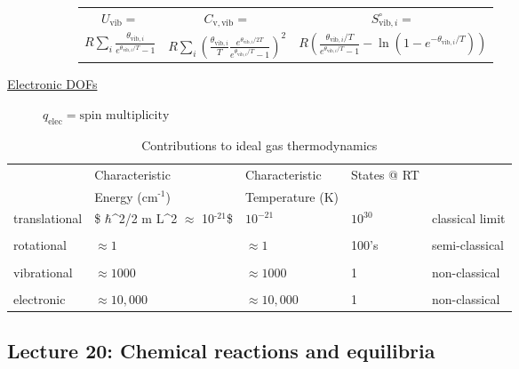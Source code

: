 \documentclass[11pt]{article}
\begin{document}
\begin{table}
\begin{center}
\begin{description}
\begin{description}
\begin{tabular}{ccc}
$ U_\mathrm{vib}= $ & $  C_\mathrm{v,vib} = $ & $S^\circ_{\mathrm{vib},i}=$ \\
$\displaystyle
R\sum_i\frac{\theta_{\mathrm{vib},i}}{e^{\theta_{\mathrm{vib},i}/T}-1}$ &
$\displaystyle R \sum_i \left (
  \frac{\theta_{\mathrm{vib},i}}{T}\frac{e^{\theta_{\mathrm{vib},i}/2T}}{e^{\theta_{\mathrm{vib},i}/T}-1}
\right )^2 $ & $\displaystyle R \left ( \frac{\theta_{\mathrm{vib},i}/T}{e^{\theta_{\mathrm{vib},i}/T}-1}
-\ln(1-e^{-\theta_{\mathrm{vib},i}/T})\right ) $ \\
\end{tabular}

\end{description}
\item[\underline{Electronic DOFs}] {}
$q_\mathrm{elec} = \text{spin multiplicity}$


\end{description}
\end{center}
\end{table}

\begin{table}[htbp]
\caption{Contributions to ideal gas thermodynamics}
\centering
\begin{tabular}{lllll}
\hline
 & Characteristic & Characteristic & States @ RT & \\
 & Energy (cm\(^{\text{-1}}\)) & Temperature (K) &  & \\
\hline
translational & \$ \(\hbar\)\^{}2/2 m L\^{}2 \(\approx\) 10\(^{\text{-21}}\)\$ & \(10^{-21}\) & \(10^{30}\) & classical limit\\
 &  &  &  & \\
rotational & \(\approx 1\) & \(\approx 1\) & 100's & semi-classical\\
 &  &  &  & \\
vibrational & \(\approx 1000\) & \(\approx 1000\) & 1 & non-classical\\
 &  &  &  & \\
electronic & \(\approx 10,000\) & \(\approx 10,000\) & 1 & non-classical\\
\hline
\end{tabular}
\end{table}

\subsection{Lecture 20: Chemical reactions and equilibria}
\label{sec:org8868e1a}
\end{document}
